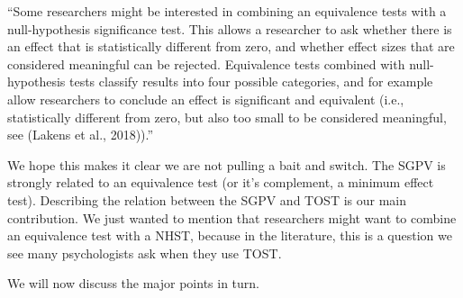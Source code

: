 \documentclass[man]{apa6}
\begin{document}
\enquote{Some researchers might be interested in combining an equivalence tests with a null-hypothesis significance test. This allows a researcher to ask whether there is an effect that is statistically different from zero, and whether effect sizes that are considered meaningful can be rejected. Equivalence tests combined with null-hypothesis tests classify results into four possible categories, and for example allow researchers to conclude an effect is significant and equivalent (i.e., statistically different from zero, but also too small to be considered meaningful, see (Lakens et al., 2018)).}

We hope this makes it clear we are not pulling a bait and switch. The SGPV is strongly related to an equivalence test (or it's complement, a minimum effect test). Describing the relation between the SGPV and TOST is our main contribution. We just wanted to mention that researchers might want to combine an equivalence test with a NHST, because in the literature, this is a question we see many psychologists ask when they use TOST.

We will now discuss the major points in turn.
\end{document}
